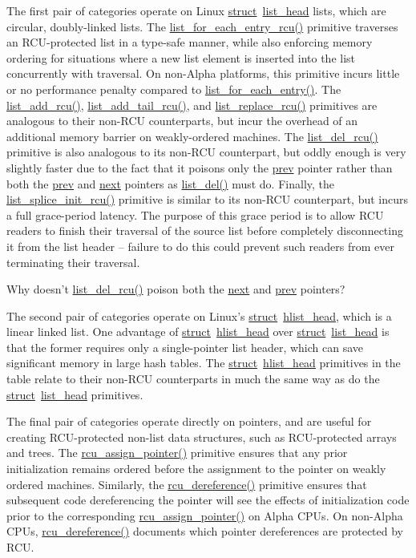 The first pair of categories operate on Linux
\url{struct}~\url{list_head} lists, which are circular, doubly-linked
lists.
The \url{list_for_each_entry_rcu()} primitive traverses an
RCU-protected list in a type-safe manner, while also enforcing
memory ordering for situations where a new list element is inserted
into the list concurrently with traversal.
On non-Alpha platforms, this primitive incurs little or no performance
penalty compared to \url{list_for_each_entry()}.
The \url{list_add_rcu()}, \url{list_add_tail_rcu()},
and \url{list_replace_rcu()} primitives are analogous to
their non-RCU counterparts, but incur the overhead of an additional
memory barrier on weakly-ordered machines.
The \url{list_del_rcu()} primitive is also analogous to its
non-RCU counterpart, but oddly enough is very slightly faster due to the
fact that it poisons only the \url{prev} pointer rather than
both the \url{prev} and \url{next} pointers as
\url{list_del()} must do.
Finally, the \url{list_splice_init_rcu()} primitive is similar
to its non-RCU counterpart, but incurs a full grace-period latency.
The purpose of this grace period is to allow RCU readers to finish
their traversal of the source list before completely disconnecting
it from the list header -- failure to do this could prevent such
readers from ever terminating their traversal.

\QuickQuiz{}
	Why doesn't \url{list_del_rcu()} poison both the \url{next}
	and \url{prev} pointers?
 \QuickQuizEnd

The second pair of categories operate on Linux's
\url{struct}~\url{hlist_head}, which is a linear linked list.
One advantage of \url{struct}~\url{hlist_head} over
\url{struct}~\url{list_head} is that the former requires only
a single-pointer list header, which can save significant memory in
large hash tables.
The \url{struct}~\url{hlist_head} primitives in the table
relate to their non-RCU counterparts in much the same way as do the
\url{struct}~\url{list_head} primitives.

The final pair of categories operate directly on pointers, and
are useful for creating RCU-protected non-list data structures,
such as RCU-protected arrays and trees.
The \url{rcu_assign_pointer()} primitive ensures that any
prior initialization remains ordered before the assignment to the
pointer on weakly ordered machines.
Similarly, the \url{rcu_dereference()} primitive ensures that subsequent
code dereferencing the pointer will see the effects of initialization code
prior to the corresponding \url{rcu_assign_pointer()} on
Alpha CPUs.
On non-Alpha CPUs, \url{rcu_dereference()} documents which pointer
dereferences are protected by RCU.

